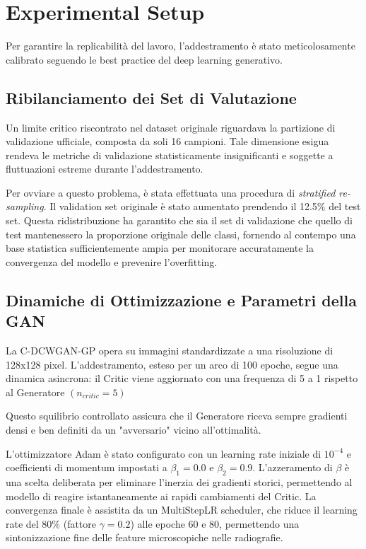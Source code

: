 \section{Experimental Setup}

Per garantire la replicabilità del lavoro, l'addestramento è stato meticolosamente calibrato seguendo le best practice del deep learning generativo.

\subsection{Ribilanciamento dei Set di Valutazione}

Un limite critico riscontrato nel dataset originale riguardava la partizione di validazione ufficiale, composta da soli 16 campioni. Tale dimensione esigua rendeva le metriche di validazione statisticamente insignificanti e soggette a fluttuazioni estreme durante l'addestramento. 

Per ovviare a questo problema, è stata effettuata una procedura di \textit{stratified re-sampling}. Il validation set originale è stato aumentato prendendo il 12.5\% del test set. Questa ridistribuzione ha garantito che sia il set di validazione che quello di test mantenessero la proporzione originale delle classi, fornendo al contempo una base statistica sufficientemente ampia per monitorare accuratamente la convergenza del modello e prevenire l'overfitting.

\subsection{Dinamiche di Ottimizzazione e Parametri della GAN}

La C-DCWGAN-GP opera su immagini standardizzate a una risoluzione di 128x128 pixel. L'addestramento, esteso per un arco di 100 epoche, segue una dinamica asincrona: il Critic viene aggiornato con una frequenza di 5 a 1 rispetto al Generatore $(n_{critic} = 5)$

Questo squilibrio controllato assicura che il Generatore riceva sempre gradienti densi e ben definiti da un "avversario" vicino all'ottimalità.

L'ottimizzatore Adam è stato configurato con un learning rate iniziale di $10^{-4}$ e coefficienti di momentum impostati a $\beta_1 = 0.0$ e $\beta_2 = 0.9$. L'azzeramento di $\beta$ è una scelta deliberata per eliminare l'inerzia dei gradienti storici, permettendo al modello di reagire istantaneamente ai rapidi cambiamenti del Critic. La convergenza finale è assistita da un MultiStepLR scheduler, che riduce il learning 
rate del 80\% (fattore $\gamma = 0.2$) alle epoche 60 e 80, permettendo una sintonizzazione fine delle feature microscopiche nelle radiografie.

